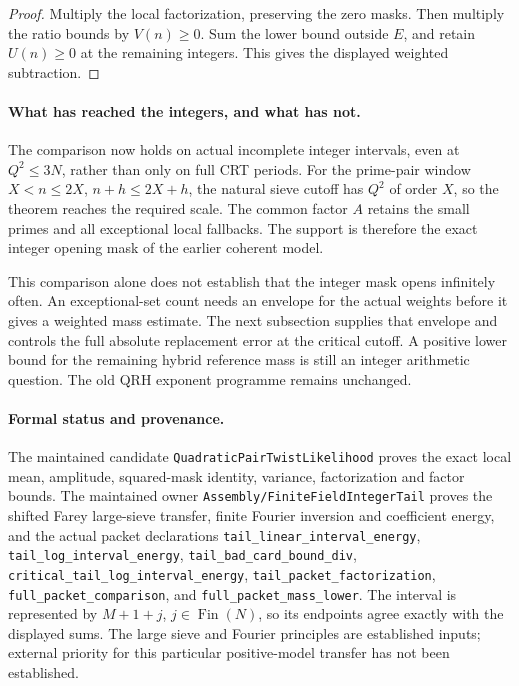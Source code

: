 \documentclass[11pt]{article}
\begin{document}
\begin{proof}
Multiply the local factorization, preserving the zero masks.
Then multiply the ratio bounds by \(V(n)\geq0\).
Sum the lower bound outside \(E\), and retain \(U(n)\geq0\)
at the remaining integers. This gives the displayed weighted subtraction.
\end{proof}

\paragraph{What has reached the integers, and what has not.}
The comparison now holds on actual incomplete integer intervals,
even at \(Q^2\leq3N\), rather than only on full CRT periods.
For the prime-pair window \(X<n\leq2X\), \(n+h\leq2X+h\),
the natural sieve cutoff has \(Q^2\) of order \(X\), so the theorem
reaches the required scale. The common factor \(A\) retains the
small primes and all exceptional local fallbacks. The support is
therefore the exact integer opening mask of the earlier coherent
model.

This comparison alone does not establish that the integer mask opens
infinitely often. An exceptional-set count needs an envelope for the
actual weights before it gives a weighted mass estimate. The next
subsection supplies that envelope and controls the full absolute
replacement error at the critical cutoff. A positive lower bound for
the remaining hybrid reference mass is still an integer arithmetic
question. The old QRH exponent programme remains unchanged.

\paragraph{Formal status and provenance.}
The maintained candidate \texttt{QuadraticPairTwistLikelihood}
proves the exact local mean, amplitude, squared-mask identity,
variance, factorization and factor bounds.
The maintained owner \texttt{Assembly/FiniteFieldIntegerTail}
proves the shifted Farey large-sieve transfer, finite Fourier inversion
and coefficient energy, and the actual packet declarations
\texttt{tail\_linear\_interval\_energy},
\texttt{tail\_log\_interval\_energy},
\texttt{tail\_bad\_card\_bound\_div},
\texttt{critical\_tail\_log\_interval\_energy},
\texttt{tail\_packet\_factorization},
\texttt{full\_packet\_comparison}, and
\texttt{full\_packet\_mass\_lower}.
The interval is represented by \(M+1+j\), \(j\in\operatorname{Fin}(N)\),
so its endpoints agree exactly with the displayed sums.
The large sieve and Fourier principles are established inputs;
external priority for this particular positive-model transfer
has not been established.
\end{document}
